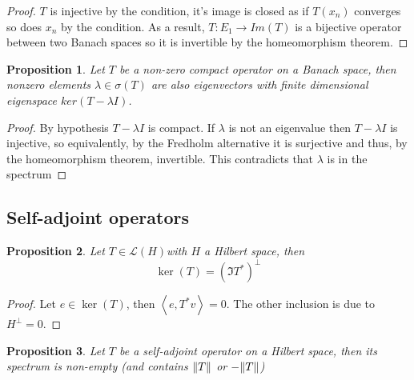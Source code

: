 \documentclass[12pt]{article}
\newtheorem{proposition}{Proposition}
\newcommand{\br}[1]{\left\langle#1\right\rangle}
\begin{document}
\begin{proof}
	$T$ is injective by the condition, it's image is closed as if $T(x_n)$ converges so does $x_n$ by the condition. As a result, $T:E_1\to Im(T)$ is a bijective operator between two Banach spaces so it is invertible by the homeomorphism theorem.
\end{proof}
\begin{proposition}
	Let $T$ be a non-zero compact operator on a Banach space, then nonzero elements $\lambda\in\sigma(T)$ are also eigenvectors with finite dimensional eigenspace $ker(T-\lambda I)$.
\end{proposition}
\begin{proof}
	By hypothesis $T-\lambda I$ is compact. If $\lambda$ is not an eigenvalue then $T-\lambda I$ is injective, so equivalently, by the Fredholm alternative it is surjective and thus, by the homeomorphism theorem, invertible. This contradicts that $\lambda$ is in the spectrum
\end{proof}
\subsection{Self-adjoint operators}
\begin{proposition}
	Let $T\in\mathcal{L}(H)$with $H$ a Hilbert space, then
	\begin{equation*}
		\ker(T)=(\Im T^*)^\perp
	\end{equation*}
\end{proposition}
\begin{proof}
	Let $e\in \ker(T)$, then $\br{e,T^*v}=0$. The other inclusion is due to $H^\perp =0$.
\end{proof}
\begin{proposition}
	Let $T$ be a self-adjoint operator on a Hilbert space, then its spectrum is non-empty (and contains $\norm{T}$ or $-\norm{T}$)
\end{proposition}
\end{document}
